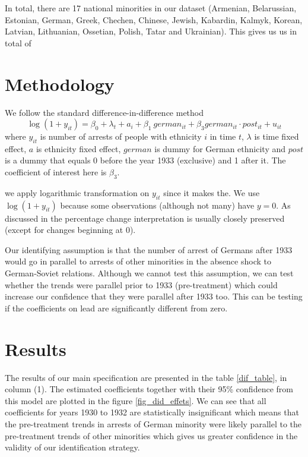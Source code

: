 \documentclass[12pt]{article}
\begin{document}
In total, there are 17 national minorities in our dataset (Armenian, Belarussian, Estonian, German, Greek, Chechen, Chinese, Jewish, Kabardin, Kalmyk, Korean, Latvian, Lithuanian, Ossetian, Polish, Tatar and Ukrainian). This gives us us in total of 


\section{Methodology}
We follow the standard difference-in-difference method
$$ \log\left(1 + y_{it}\right) = \beta_0 +\lambda_t + a_i + \beta_1 \: german_{it} + \beta_3 german_{it} \cdot post_{it} + u_{it} $$
where $y_{it}$ is number of arrests of people with ethnicity $i$ in time $t$, $\lambda$ is time fixed effect, $a$ is ethnicity fixed effect, $german$ is dummy for German ethnicity and $post$ is a dummy that equals 0 before the year 1933 (exclusive) and 1 after it. The coefficient of interest here is $\beta_3$. 

 we apply logarithmic transformation on $y_{it}$ since it makes the.  We use $\log\left(1 + y_{it}\right)$ because some observations (although not many) have $y = 0$. As discussed in \citet[p. 193]{wooldridge_introductory_2015}  the percentage change interpretation is usually  closely preserved (except for changes beginning at 0).   

Our identifying assumption is that the number of arrest of Germans after 1933 would go in parallel to arrests of other minorities in the absence shock to German-Soviet relations. Although we cannot test this assumption, we can test whether the trends were parallel prior to 1933 (pre-treatment) which could increase our confidence that they were parallel after 1933 too. This can be testing if the coefficients on lead are significantly different from zero.  
\section{Results}
The results of our main specification are presented in the table \ref{dif_table}, in column (1). The estimated coefficients together with their 95\% confidence  from this model are plotted in the figure \ref{fig_did_effets}. We can see that all coefficients for years 1930 to 1932 are statistically insignificant which means that the pre-treatment trends in arrests of German minority were likely parallel to the pre-treatment trends of other minorities which gives us greater  confidence in the validity of our identification strategy. 
\end{document}
